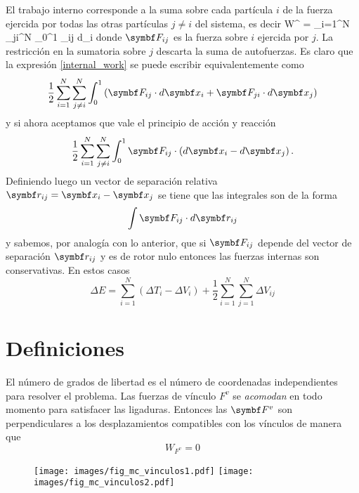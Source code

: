 \documentclass[10pt,oneside]{CBFT_book}
\begin{document}
El trabajo interno corresponde a la suma sobre cada partícula $i$ de la fuerza ejercida por todas las otras partículas 
$j \neq i$ del sistema, es decir
\be
	W^{} = \sum_{i=1}^N \sum_{j\neq i}^N \int_0^1 _{ij} \cdot d_i
	\label{internal_work}
\ee
donde $\vb{F}_{ij} $ es la fuerza sobre $i$ ejercida por $j$. La restricción en la sumatoria sobre $j$ descarta la suma 
de autofuerzas. Es claro que la expresión \eqref{internal_work} se puede escribir equivalentemente como
\[
	\frac{1}{2} \sum_{i=1}^N \sum_{j\neq i}^N \int_0^1 
	\left( \vb{F}_{ij} \cdot d\vb{x}_i + \vb{F}_{ji} \cdot d\vb{x}_j \right) 
\]
%
y si ahora aceptamos que vale el principio de acción y reacción
\[
	\frac{1}{2} \sum_{i=1}^N \sum_{j\neq i}^N \int_0^1 
	\vb{F}_{ij} \cdot \left(d\vb{x}_i - d\vb{x}_j \right) .
\]
Definiendo luego un vector de separación relativa $ \vb{r}_{ij} = \vb{x}_i - \vb{x}_j $ se tiene que las integrales son 
de la forma 
\[
	\int \vb{F}_{ij} \cdot d\vb{r}_{ij}
\]
y sabemos, por analogía con lo anterior, que si $\vb{F}_{ij}$ depende del vector de separación $ \vb{r}_{ij} $ y es de 
rotor nulo entonces las fuerzas internas son conservativas.
En estos casos
\[
	\Delta E = \sum_{i=1}^N ( \Delta T_i - \Delta V_i ) + \frac{1}{2} \sum_{i=1}^N \sum_{j=1}^N \Delta V_{ij}
\]


\section{Definiciones}

El número de grados de libertad es el número de coordenadas independientes para resolver el problema.
Las fuerzas de vínculo $F^v$ se {\it acomodan} en todo momento para satisfacer las ligaduras.
Entonces las $\vb{F}^v$ son perpendiculares a los desplazamientos compatibles con los vínculos de
manera que 
\[
	W_{F^v} = 0
\]
\begin{figure}[hbt]
	\begin{center}
	\texttt{[image: images/fig\_mc\_vinculos1.pdf]}	 
	\texttt{[image: images/fig\_mc\_vinculos2.pdf]}
	\end{center}
	\caption{}
\end{figure} 
\end{document}
